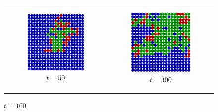 \begin{figure}
\begin{center}
	\begin{tabular}{c c}
		\begin{subfigure}[b]{0.3\textwidth}
			\centering
			\includegraphics[width=1\textwidth, angle=0]{./fig/step5_environment/SIR_environment_30x30agents_t50_01dt.png}
			\caption{$t = 50$}
			\label{fig:sir_env_t50}
		\end{subfigure}
    	&
		\begin{subfigure}[b]{0.3\textwidth}
			\centering
			\includegraphics[width=1\textwidth, angle=0]{./fig/step5_environment/SIR_environment_30x30agents_t100_01dt.png}
			\caption{$t = 100$}
			\label{fig:sir_env_t100}
		\end{subfigure}
    	

\end{tabular}
\end{center}
\end{figure}
